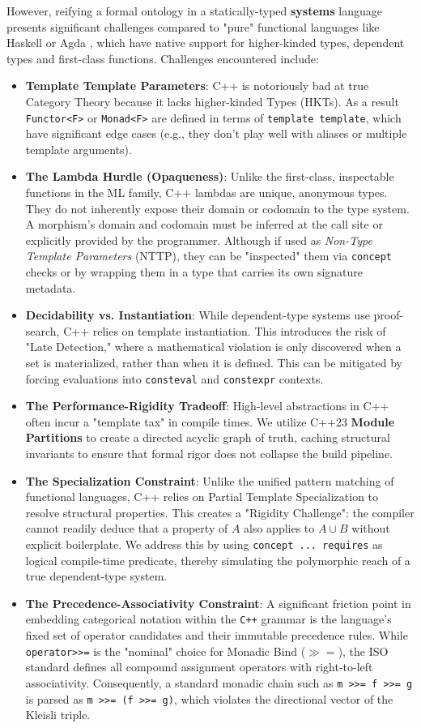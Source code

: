 \documentclass[11pt, a4paper]{report}
\begin{document}
However, reifying a formal ontology in a statically-typed \textbf{systems} language presents significant challenges compared to "pure" functional languages like Haskell \cite{GHC2024} or Agda \cite{norell2007towards}, which have native support for higher-kinded types, dependent types and first-class functions.
Challenges encountered include:
\begin{itemize}
\item \textbf{Template Template Parameters}: C++ is notoriously bad at true Category Theory because it lacks higher-kinded Types (HKTs).  As a result \texttt{Functor<F>} or \texttt{Monad<F>} are defined in terms of \texttt{template template}, which have significant edge cases (e.g., they don't play well with aliases or multiple template arguments).
\item \textbf{The Lambda Hurdle (Opaqueness)}: Unlike the first-class, inspectable functions in the ML family, C++ lambdas are unique, anonymous types. They do not inherently expose their domain or codomain to the type system. A morphism's domain and codomain must be inferred at the call site or explicitly provided by the programmer. Although if used as \textit{Non-Type Template Parameters} (NTTP),  they can be "inspected" them via \texttt{concept} checks or by wrapping them in a type that carries its own signature metadata.
\item \textbf{Decidability vs. Instantiation}: While dependent-type systems use proof-search, C++ relies on template instantiation. This introduces the risk of "Late Detection," where a mathematical violation is only discovered when a set is materialized, rather than when it is defined. This can be mitigated by forcing evaluations into \texttt{consteval} and \texttt{constexpr} contexts.
\item \textbf{The Performance-Rigidity Tradeoff}: High-level abstractions in C++ often incur a "template tax" in compile times. We utilize C++23 \textbf{Module Partitions} to create a directed acyclic graph of truth, caching structural invariants to ensure that formal rigor does not collapse the build pipeline.
\item \textbf{The Specialization Constraint}: Unlike the unified pattern matching of functional languages, C++ relies on Partial Template Specialization to resolve structural properties.
This creates a "Rigidity Challenge": the compiler cannot readily deduce that a property of $A$ also applies to $A \cup B$ without explicit boilerplate. We address this by using \texttt{concept ... requires} as logical compile-time predicate, thereby simulating the polymorphic reach of a true dependent-type system.
\item \textbf{The Precedence-Associativity Constraint}: A significant friction point in embedding categorical notation within the \texttt{C++} grammar is the language's fixed set of operator candidates and their immutable precedence rules. While \texttt{operator>>=} is the "nominal" choice for Monadic Bind ($\gg=$), the ISO standard defines all compound assignment operators with right-to-left associativity. Consequently, a standard monadic chain such as \texttt{m >>= f >>= g} is parsed as \texttt{m >>= (f >>= g)}, which violates the directional vector of the Kleisli triple.


\end{itemize}
\end{document}
